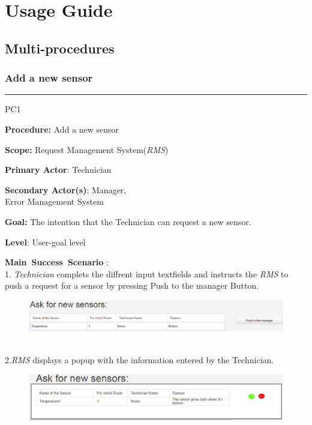 \chapter{Usage Guide}

\label{chap:usage_guide}



\section{Multi-procedures}

\subsection{Add a new sensor}
\vspace{0.5cm}
\hfill
\hrule
\begin{lyxlist}{PC1}
\small{
\item [\textbf{Procedure:}] Add a new sensor
\item [\textbf{Scope:}] Request Management System(\emph{RMS})
\item [\textbf{Primary Actor}:] Technician
\item [\textbf{Secondary Actor(s)}:] Manager,\\
 Error Management System
\item [\textbf{Goal:}] The intention that the Technician can request a new
sensor.
\item [\textbf{Level}:] User-goal level
\item [\textbf{Main~Success~Scenario}]:\\
1. \emph{Technician} complets the diffrent input textfields and instructs the
\emph{RMS} to push a request for a sensor by pressing Push to the manager Button.
\begin{figure}[h]
\includegraphics[width=1\textwidth]{images/AskForNewSensor.eps}
\end{figure} \\
2.\emph{RMS} displays a popup with the information entered by the Technician.\\
 \begin{figure}[h]
\includegraphics[width=1\textwidth]{images/AskForANewSensorPopUp.eps}
\end{figure}\\

}
\end{lyxlist}
